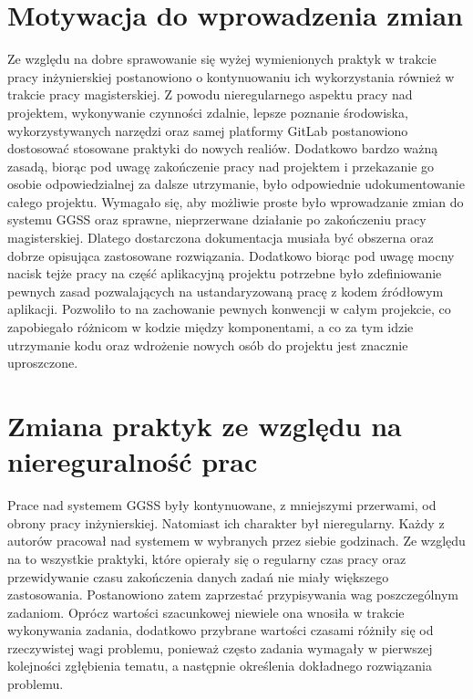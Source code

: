 \section{Motywacja do wprowadzenia zmian}
Ze względu na dobre sprawowanie się wyżej wymienionych praktyk w trakcie pracy inżynierskiej postanowiono o kontynuowaniu ich wykorzystania również w trakcie pracy magisterskiej. Z powodu nieregularnego aspektu pracy nad projektem, wykonywanie czynności zdalnie, lepsze poznanie środowiska, wykorzystywanych narzędzi oraz samej platformy GitLab postanowiono dostosować stosowane praktyki do nowych realiów. Dodatkowo bardzo ważną zasadą, biorąc pod uwagę zakończenie pracy nad projektem i przekazanie go osobie odpowiedzialnej za dalsze utrzymanie, było odpowiednie udokumentowanie całego projektu. Wymagało się, aby możliwie proste było wprowadzanie zmian do systemu GGSS oraz sprawne, nieprzerwane działanie po zakończeniu pracy magisterskiej. Dlatego dostarczona dokumentacja musiała być obszerna oraz dobrze opisująca zastosowane rozwiązania. Dodatkowo biorąc pod uwagę mocny nacisk tejże pracy na część aplikacyjną projektu potrzebne było zdefiniowanie pewnych zasad pozwalających na ustandaryzowaną pracę z kodem źródłowym aplikacji. Pozwoliło to na zachowanie pewnych konwencji w całym projekcie, co zapobiegało różnicom w kodzie między komponentami, a co za tym idzie utrzymanie kodu oraz wdrożenie nowych osób do projektu jest znacznie uproszczone.


\section{Zmiana praktyk ze względu na niereguralność prac}

Prace nad systemem GGSS były kontynuowane, z mniejszymi przerwami, od obrony pracy inżynierskiej. Natomiast ich charakter był nieregularny. Każdy z autorów pracował nad systemem w wybranych przez siebie godzinach. Ze względu na to wszystkie praktyki, które opierały się o regularny czas pracy oraz przewidywanie czasu zakończenia danych zadań nie miały większego zastosowania. Postanowiono zatem zaprzestać przypisywania wag poszczególnym zadaniom. Oprócz wartości szacunkowej niewiele ona wnosiła w trakcie wykonywania zadania, dodatkowo przybrane wartości czasami różniły się od rzeczywistej wagi problemu, ponieważ często zadania wymagały w pierwszej kolejności zgłębienia tematu, a następnie określenia dokładnego rozwiązania problemu.

